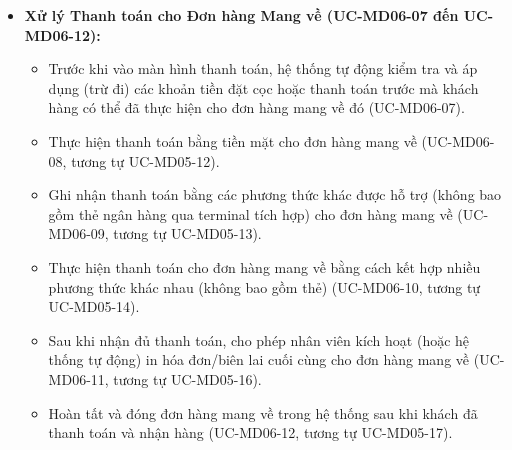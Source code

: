 \begin{itemize}
    \item \textbf{Xử lý Thanh toán cho Đơn hàng Mang về (UC-MD06-07 đến UC-MD06-12):}
    \begin{itemize}
        \item Trước khi vào màn hình thanh toán, hệ thống tự động kiểm tra và áp dụng (trừ đi) các khoản tiền đặt cọc hoặc thanh toán trước mà khách hàng có thể đã thực hiện cho đơn hàng mang về đó (UC-MD06-07).
        \item Thực hiện thanh toán bằng tiền mặt cho đơn hàng mang về (UC-MD06-08, tương tự UC-MD05-12).
        \item Ghi nhận thanh toán bằng các phương thức khác được hỗ trợ (không bao gồm thẻ ngân hàng qua terminal tích hợp) cho đơn hàng mang về (UC-MD06-09, tương tự UC-MD05-13).
        \item Thực hiện thanh toán cho đơn hàng mang về bằng cách kết hợp nhiều phương thức khác nhau (không bao gồm thẻ) (UC-MD06-10, tương tự UC-MD05-14).
        \item Sau khi nhận đủ thanh toán, cho phép nhân viên kích hoạt (hoặc hệ thống tự động) in hóa đơn/biên lai cuối cùng cho đơn hàng mang về (UC-MD06-11, tương tự UC-MD05-16).
        \item Hoàn tất và đóng đơn hàng mang về trong hệ thống sau khi khách đã thanh toán và nhận hàng (UC-MD06-12, tương tự UC-MD05-17).
    \end{itemize}
\end{itemize}

